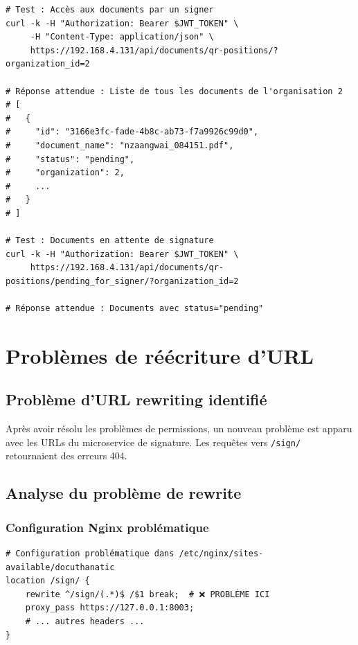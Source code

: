 \documentclass[12pt,a4paper]{article}
\begin{document}
\begin{lstlisting}[style=bash, caption={Tests des permissions corrigées}]
# Test : Accès aux documents par un signer
curl -k -H "Authorization: Bearer $JWT_TOKEN" \
     -H "Content-Type: application/json" \
     https://192.168.4.131/api/documents/qr-positions/?organization_id=2

# Réponse attendue : Liste de tous les documents de l'organisation 2
# [
#   {
#     "id": "3166e3fc-fade-4b8c-ab73-f7a9926c99d0",
#     "document_name": "nzaangwai_084151.pdf",
#     "status": "pending",
#     "organization": 2,
#     ...
#   }
# ]

# Test : Documents en attente de signature
curl -k -H "Authorization: Bearer $JWT_TOKEN" \
     https://192.168.4.131/api/documents/qr-positions/pending_for_signer/?organization_id=2

# Réponse attendue : Documents avec status="pending"
\end{lstlisting}


\section{Problèmes de réécriture d'URL}

\subsection{Problème d'URL rewriting identifié}

Après avoir résolu les problèmes de permissions, un nouveau problème est apparu avec les URLs du microservice de signature. Les requêtes vers \texttt{/sign/} retournaient des erreurs 404.

\subsection{Analyse du problème de rewrite}

\subsubsection{Configuration Nginx problématique}

\begin{lstlisting}[style=bash, caption={Configuration Nginx causant le problème}]
# Configuration problématique dans /etc/nginx/sites-available/docuthanatic
location /sign/ {
    rewrite ^/sign/(.*)$ /$1 break;  # ❌ PROBLÈME ICI
    proxy_pass https://127.0.0.1:8003;
    # ... autres headers ...
}
\end{lstlisting}
\end{document}
